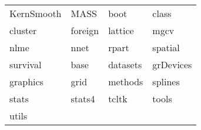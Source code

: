 \begin{tabular}{llll} 
KernSmooth & MASS & boot & class\\ 
cluster & foreign & lattice & mgcv\\ 
nlme & nnet & rpart & spatial\\ 
survival & base & datasets & grDevices\\ 
graphics & grid & methods & splines\\ 
stats & stats4 & tcltk & tools\\ 
utils  &   &   &   \\ 
\end{tabular}
